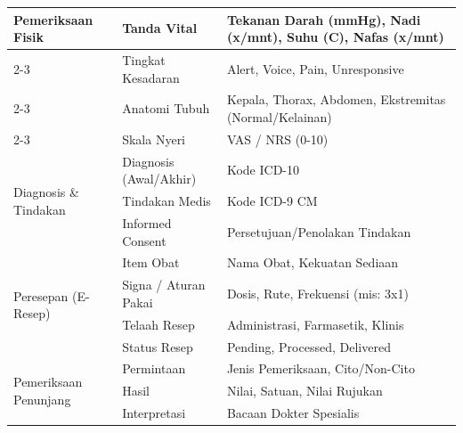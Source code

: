 \begin{longtable}{|p{4cm}|p{5cm}|p{5cm}|}
	\multirow{4}{4cm}{Pemeriksaan Fisik}
	                       & Tanda Vital               & Tekanan Darah (mmHg), Nadi (x/mnt), Suhu (C), Nafas (x/mnt) \\ \cline{2-3}
	                       & Tingkat Kesadaran         & Alert, Voice, Pain, Unresponsive                            \\ \cline{2-3}
	                       & Anatomi Tubuh             & Kepala, Thorax, Abdomen, Ekstremitas (Normal/Kelainan)      \\ \cline{2-3}
	                       & Skala Nyeri               & VAS / NRS (0-10)                                            \\ \hline

	\multirow{3}{4cm}{Diagnosis \& Tindakan}
	                       & Diagnosis (Awal/Akhir)    & Kode ICD-10                                                 \\ \cline{2-3}
	                       & Tindakan Medis            & Kode ICD-9 CM                                               \\ \cline{2-3}
	                       & Informed Consent          & Persetujuan/Penolakan Tindakan                              \\ \hline

	\multirow{4}{4cm}{Peresepan (E-Resep)}
	                       & Item Obat                 & Nama Obat, Kekuatan Sediaan                                 \\ \cline{2-3}
	                       & Signa / Aturan Pakai      & Dosis, Rute, Frekuensi (mis: 3x1)                           \\ \cline{2-3}
	                       & Telaah Resep              & Administrasi, Farmasetik, Klinis                            \\ \cline{2-3}
	                       & Status Resep              & Pending, Processed, Delivered                               \\ \hline

	\multirow{3}{4cm}{Pemeriksaan Penunjang}
	                       & Permintaan                & Jenis Pemeriksaan, Cito/Non-Cito                            \\ \cline{2-3}
	                       & Hasil                     & Nilai, Satuan, Nilai Rujukan                                \\ \cline{2-3}
	                       & Interpretasi              & Bacaan Dokter Spesialis                                     \\ \hline
\end{longtable}